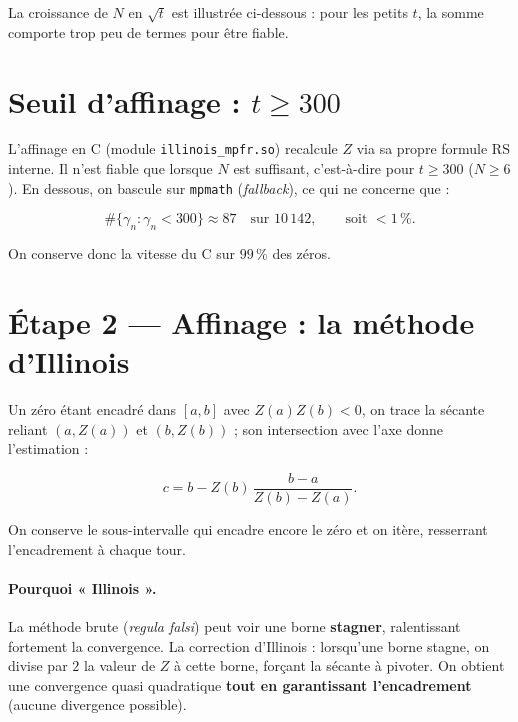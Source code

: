 \documentclass[11pt,a4paper]{article}
\begin{document}
La croissance de $N$ en $\sqrt{t}$ est illustrée ci-dessous : pour les petits $t$, la somme
comporte trop peu de termes pour être fiable.

\begin{center}
\end{center}

\section{Seuil d'affinage : $t \geq 300$}

L'affinage en C (module \texttt{illinois\_mpfr.so}) recalcule $Z$ via sa propre formule RS
interne. Il n'est fiable que lorsque $N$ est suffisant, c'est-à-dire pour $t \geq 300$
($N \geq 6$). En dessous, on bascule sur \texttt{mpmath} (\emph{fallback}), ce qui ne
concerne que :

\[
\#\{ \gamma_n : \gamma_n < 300 \} \approx 87 \quad \text{sur } 10\,142,
\qquad \text{soit } < 1\,\% .
\]

On conserve donc la vitesse du C sur $99\,\%$ des zéros.

\section{Étape 2 --- Affinage : la méthode d'Illinois}

Un zéro étant encadré dans $[a,b]$ avec $Z(a)Z(b)<0$, on trace la sécante reliant
$(a, Z(a))$ et $(b, Z(b))$ ; son intersection avec l'axe donne l'estimation :

\[
c = b - Z(b)\,\frac{b-a}{Z(b)-Z(a)} .
\]

On conserve le sous-intervalle qui encadre encore le zéro et on itère, resserrant
l'encadrement à chaque tour.

\paragraph{Pourquoi « Illinois ».}
La méthode brute (\emph{regula falsi}) peut voir une borne \textbf{stagner}, ralentissant
fortement la convergence. La correction d'Illinois : lorsqu'une borne stagne, on divise par
$2$ la valeur de $Z$ à cette borne, forçant la sécante à pivoter. On obtient une convergence
quasi quadratique \textbf{tout en garantissant l'encadrement} (aucune divergence possible).
\end{document}
